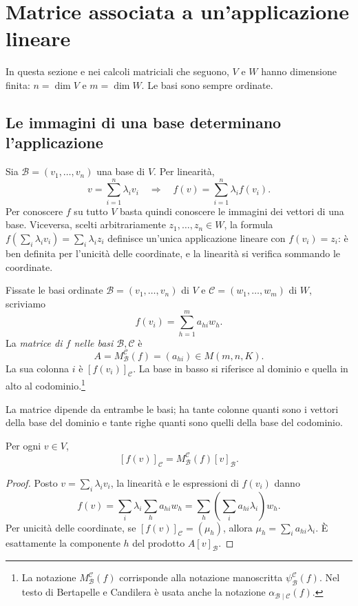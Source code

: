 \section{Matrice associata a un'applicazione lineare}
In questa sezione e nei calcoli matriciali che seguono, $V$ e $W$ hanno dimensione finita: $n=\dim V$ e $m=\dim W$. Le basi sono sempre ordinate.
\subsection{Le immagini di una base determinano l'applicazione}
Sia $\mathcal B=(v_1,\ldots,v_n)$ una base di $V$. Per linearità,
\[
 v=\sum_{i=1}^n\lambda_iv_i\quad\Longrightarrow\quad
 f(v)=\sum_{i=1}^n\lambda_if(v_i).
\]
Per conoscere $f$ su tutto $V$ basta quindi conoscere le immagini dei vettori di una base. Viceversa, scelti arbitrariamente $z_1,\ldots,z_n\in W$, la formula $f(\sum_i\lambda_iv_i)=\sum_i\lambda_iz_i$ definisce un'unica applicazione lineare con $f(v_i)=z_i$: è ben definita per l'unicità delle coordinate, e la linearità si verifica sommando le coordinate.

\begin{definizione}
Fissate le basi ordinate $\mathcal B=(v_1,\ldots,v_n)$ di $V$ e $\mathcal C=(w_1,\ldots,w_m)$ di $W$, scriviamo
\[
 f(v_i)=\sum_{h=1}^m a_{hi}w_h.
\]
La \emph{matrice di $f$ nelle basi $\mathcal B,\mathcal C$} è
\[
 A=M_{\mathcal B}^{\mathcal C}(f)=(a_{hi})\in M(m,n,K).
\]
La sua colonna $i$ è $[f(v_i)]_{\mathcal C}$. La base in basso si riferisce al dominio e quella in alto al codominio.\footnote{La notazione $M_{\mathcal B}^{\mathcal C}(f)$ corrisponde alla notazione manoscritta $\psi_{\mathcal B}^{\mathcal C}(f)$. Nel testo di Bertapelle e Candilera è usata anche la notazione $\alpha_{\mathcal B\mid\mathcal C}(f)$.}
\end{definizione}
La matrice dipende da entrambe le basi; ha tante colonne quanti sono i vettori della base del dominio e tante righe quanti sono quelli della base del codominio.

\begin{proposizione}
\label{prop:coordinate-applicazione}
Per ogni $v\in V$,
\[
 [f(v)]_{\mathcal C}=M_{\mathcal B}^{\mathcal C}(f)[v]_{\mathcal B}.
\]
\end{proposizione}
\begin{proof}
Posto $v=\sum_i\lambda_iv_i$, la linearità e le espressioni di $f(v_i)$ danno
\[
 f(v)=\sum_i\lambda_i\sum_h a_{hi}w_h
     =\sum_h\left(\sum_i a_{hi}\lambda_i\right)w_h.
\]
Per unicità delle coordinate, se $[f(v)]_{\mathcal C}=(\mu_h)$, allora $\mu_h=\sum_i a_{hi}\lambda_i$. È esattamente la componente $h$ del prodotto $A[v]_{\mathcal B}$.
\end{proof}

